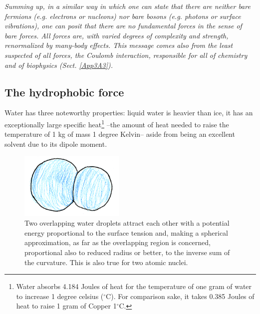\begin{subappendices}
\emph{Summing up, in a similar way in which one can state that there are neither bare fermions (e.g. electrons or nucleons) nor bare bosons (e.g. photons or surface vibrations),  one can posit that there are no fundamental forces in the sense of bare
forces.  All forces are, with varied degrees of complexity and strength, renormalized 
by many-body effects. This message comes also from  the least suspected of all forces, the Coulomb interaction, responsible for all of chemistry and of biophysics (Sect. \ref{App3A3}).}
\subsection{The hydrophobic force}
Water has three noteworthy properties: liquid water is heavier than ice, it has an exceptionally large specific heat\footnote{Water absorbs 4.184 Joules of heat for the temperature of one gram of water to increase 1 degree celsius ($^\circ$C). For comparison sake, it takes 0.385 Joules of heat to raise 1 gram of Copper 1$^\circ$C.} --the amount of heat needed to raise the temperature of 1 kg of mass 1 degree Kelvin-- aside from being an excellent solvent due to its dipole moment.
\begin{figure}
\centerline{\includegraphics[width=5cm]{C8/figsC8/fig6G4.pdf}}
\caption{Two overlapping water droplets attract each other with a potential energy proportional to the surface
tension and, making a spherical approximation, as far as the overlapping region is concerned, proportional
also to reduced radius or better, to the inverse sum of the curvature. This is also true for two atomic nuclei.}\label{fig6G4}
\end{figure}


\end{subappendices}
